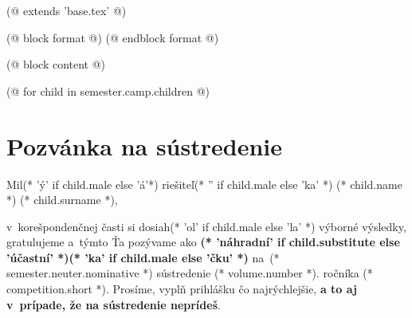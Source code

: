(@ extends 'base.tex' @)

(@ block format @)
    \renewcommand{\headrulewidth}{0pt}
    \renewcommand{\footrulewidth}{0pt}
(@ endblock format @)

(@ block content @)
    \pagestyle{seminar-invite}

    (@ for child in semester.camp.children @)
        \section{Pozvánka na sústredenie}
            Mil(* 'ý' if child.male else 'á'*) riešiteľ(* '' if child.male else 'ka' *) (* child.name *) (* child.surname *),

            v~korešpondenčnej časti si dosiah(* 'ol' if child.male else 'la' *) výborné výsledky,
            gratulujeme a~týmto Ťa pozývame ako \textbf{(* 'náhradní' if child.substitute else 'účastní' *)(* 'ka' if child.male else 'čku' *)}
            na~(* semester.neuter.nominative *) sústredenie (* volume.number *). ročníka (* competition.short *).
            Prosíme, vyplň prihlášku čo najrýchlejšie, \textbf{a to aj v~prípade, že na sústredenie neprídeš}.

